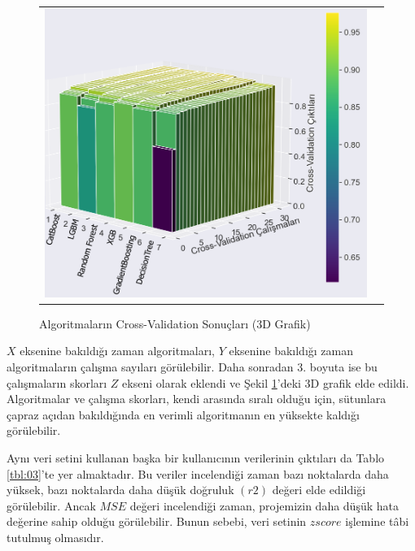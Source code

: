 \documentclass[conference]{IEEEtran}
\begin{document}
\begin{figure}[!h]
	\centering
	\begin{center}
		\begin{tabular}{cc}
			\includegraphics[scale=0.35]{pictures/pic_23.png}&
		\end{tabular}
	\end{center}
	\caption{Algoritmaların Cross-Validation Sonuçları (3D Grafik)}
	\label{fig:23}
\end{figure}
\quad $X$ eksenine bakıldığı zaman algoritmaları, $Y$ eksenine bakıldığı zaman algoritmaların çalışma sayıları görülebilir. Daha sonradan 3. boyuta ise bu çalışmaların skorları $Z$ ekseni olarak eklendi ve Şekil \ref{fig:23}'deki 3D grafik elde edildi. Algoritmalar ve çalışma skorları, kendi arasında sıralı olduğu için, sütunlara çapraz açıdan bakıldığında en verimli algoritmanın en yüksekte kaldığı görülebilir.

\quad Aynı veri setini kullanan başka bir kullanıcının verilerinin\cite{17} çıktıları da Tablo \ref{tbl:03}'te yer almaktadır. Bu veriler incelendiği zaman bazı noktalarda daha yüksek, bazı noktalarda daha düşük doğruluk $(r2)$ değeri elde edildiği görülebilir. Ancak $MSE$ değeri incelendiği zaman, projemizin daha düşük hata değerine sahip olduğu görülebilir. Bunun sebebi, veri setinin $zscore$ işlemine tâbi tutulmuş olmasıdır.
\end{document}
